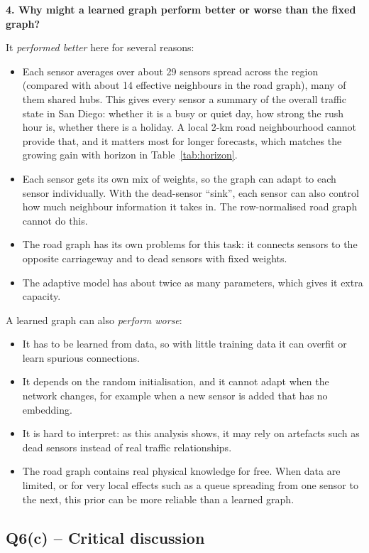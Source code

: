 \documentclass[11pt, a4paper]{article}
\begin{document}
\textbf{4. Why might a learned graph perform better or worse than the fixed graph?}

It \emph{performed better} here for several reasons:
\begin{itemize}
\item Each sensor averages over about 29 sensors spread across the region (compared with about 14 effective neighbours in the road graph), many of them shared hubs. This gives every sensor a summary of the overall traffic state in San Diego: whether it is a busy or quiet day, how strong the rush hour is, whether there is a holiday. A local 2-km road neighbourhood cannot provide that, and it matters most for longer forecasts, which matches the growing gain with horizon in Table~\ref{tab:horizon}.
\item Each sensor gets its own mix of weights, so the graph can adapt to each sensor individually. With the dead-sensor ``sink'', each sensor can also control how much neighbour information it takes in. The row-normalised road graph cannot do this.
\item The road graph has its own problems for this task: it connects sensors to the opposite carriageway and to dead sensors with fixed weights.
\item The adaptive model has about twice as many parameters, which gives it extra capacity.
\end{itemize}

A learned graph can also \emph{perform worse}:
\begin{itemize}
\item It has to be learned from data, so with little training data it can overfit or learn spurious connections.
\item It depends on the random initialisation, and it cannot adapt when the network changes, for example when a new sensor is added that has no embedding.
\item It is hard to interpret: as this analysis shows, it may rely on artefacts such as dead sensors instead of real traffic relationships.
\item The road graph contains real physical knowledge for free. When data are limited, or for very local effects such as a queue spreading from one sensor to the next, this prior can be more reliable than a learned graph.
\end{itemize}

\subsection*{Q6(c) -- Critical discussion}
\end{document}

